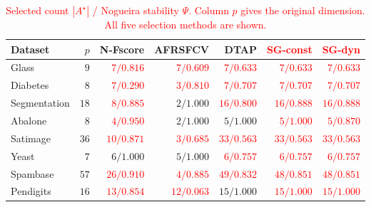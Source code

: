 \documentclass[]{interact}
\theoremstyle{plain}
\theoremstyle{definition}
\theoremstyle{remark}
\begin{document}
\begin{table}[htbp]
\centering\small\setlength{\tabcolsep}{4pt}
\caption{\textcolor{red}{Selected count $|A^\star|$ / Nogueira stability $\Psi$. Column $p$ gives the original dimension. All five selection methods are shown.}}\label{tab:nfeat}
\begin{tabular}{lrrrrrr}
\toprule
Dataset & $p$ & N-Fscore & AFRSFCV & DTAP & \leavevmode\textcolor{red}{SG-const} & \leavevmode\textcolor{red}{SG-dyn} \\
\midrule
Glass & $9$ & \leavevmode\textcolor{red}{$7/0.816$} & \leavevmode\textcolor{red}{$7/0.609$} & \leavevmode\textcolor{red}{$7/0.633$} & \leavevmode\textcolor{red}{$7/0.633$} & \leavevmode\textcolor{red}{$7/0.633$} \\
Diabetes & $8$ & \leavevmode\textcolor{red}{$7/0.290$} & \leavevmode\textcolor{red}{$3/0.810$} & \leavevmode\textcolor{red}{$7/0.707$} & \leavevmode\textcolor{red}{$7/0.707$} & \leavevmode\textcolor{red}{$7/0.707$} \\
Segmentation & $18$ & \leavevmode\textcolor{red}{$8/0.885$} & $2/1.000$ & \leavevmode\textcolor{red}{$16/0.800$} & \leavevmode\textcolor{red}{$16/0.888$} & \leavevmode\textcolor{red}{$16/0.888$} \\
Abalone & $8$ & \leavevmode\textcolor{red}{$4/0.950$} & $2/1.000$ & $5/1.000$ & \leavevmode\textcolor{red}{$5/1.000$} & \leavevmode\textcolor{red}{$5/0.870$} \\
Satimage & $36$ & \leavevmode\textcolor{red}{$10/0.871$} & \leavevmode\textcolor{red}{$3/0.685$} & \leavevmode\textcolor{red}{$33/0.563$} & \leavevmode\textcolor{red}{$33/0.563$} & \leavevmode\textcolor{red}{$33/0.563$} \\
Yeast & $7$ & $6/1.000$ & $5/1.000$ & \leavevmode\textcolor{red}{$6/0.757$} & \leavevmode\textcolor{red}{$6/0.757$} & \leavevmode\textcolor{red}{$6/0.757$} \\
Spambase & $57$ & \leavevmode\textcolor{red}{$26/0.910$} & \leavevmode\textcolor{red}{$4/0.885$} & \leavevmode\textcolor{red}{$49/0.832$} & \leavevmode\textcolor{red}{$48/0.851$} & \leavevmode\textcolor{red}{$48/0.851$} \\
Pendigits & $16$ & \leavevmode\textcolor{red}{$13/0.854$} & \leavevmode\textcolor{red}{$12/0.063$} & $15/1.000$ & \leavevmode\textcolor{red}{$15/1.000$} & \leavevmode\textcolor{red}{$15/1.000$} \\
\bottomrule
\end{tabular}

\end{table}
\end{document}
